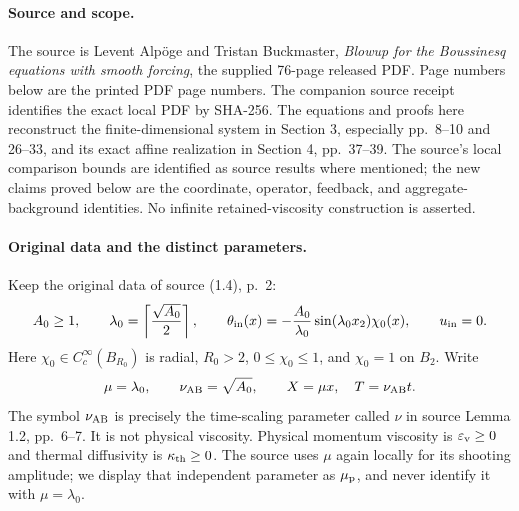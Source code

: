 \paragraph{Source and scope.}
The source is Levent Alp\"oge and Tristan Buckmaster, \emph{Blowup for the Boussinesq equations with smooth forcing}, the supplied 76-page released PDF. Page numbers below are the printed PDF page numbers. The companion source receipt identifies the exact local PDF by SHA-256. The equations and proofs here reconstruct the finite-dimensional system in Section 3, especially pp.~8--10 and 26--33, and its exact affine realization in Section 4, pp.~37--39. The source's local comparison bounds are identified as source results where mentioned; the new claims proved below are the coordinate, operator, feedback, and aggregate-background identities. No infinite retained-viscosity construction is asserted.

\paragraph{Original data and the distinct parameters.}
Keep the original data of source (1.4), p.~2:
\[
 A_0\ge1,\qquad \lambda_0=\left\lceil\frac{\sqrt{A_0}}2\right\rceil,
 \qquad \theta_{\rm in}(x)=-\frac{A_0}{\lambda_0}\sin(\lambda_0x_2)\chi_0(x),
 \qquad u_{\rm in}=0.
\]
Here $\chi_0\in C_c^\infty(B_{R_0})$ is radial, $R_0>2$, $0\le\chi_0\le1$, and $\chi_0=1$ on $B_2$. Write
\[
 \mu=\lambda_0,\qquad \nu_{\mathrm{AB}}=\sqrt{A_0},\qquad X=\mu x,\quad T=\nu_{\mathrm{AB}}t.
\]
The symbol $\nu_{\mathrm{AB}}$ is precisely the time-scaling parameter called $\nu$ in source Lemma 1.2, pp.~6--7. It is not physical viscosity. Physical momentum viscosity is $\varepsilon_{\mathrm v}\ge0$ and thermal diffusivity is $\kappa_{\mathrm{th}}\ge0$. The source uses $\mu$ again locally for its shooting amplitude; we display that independent parameter as $\mu_{\rm p}$, and never identify it with $\mu=\lambda_0$.

